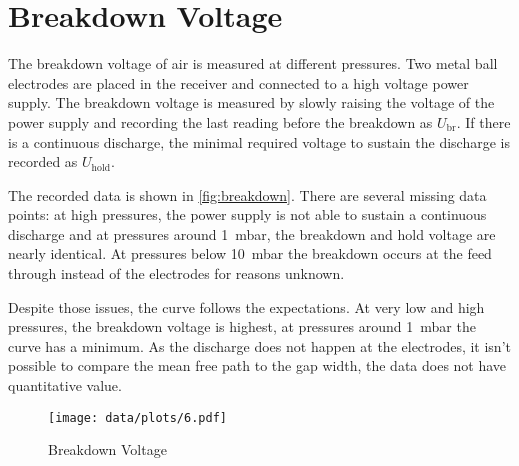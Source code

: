 \chapter{Breakdown Voltage}

The breakdown voltage of air is measured at different pressures.
Two metal ball electrodes are placed in the receiver and connected to a high voltage power supply.
The breakdown voltage is measured by slowly raising the voltage of the power supply and recording the last reading before the breakdown as $U_\text{br}$.
If there is a continuous discharge, the minimal required voltage to sustain the discharge is recorded as $U_\text{hold}$.

The recorded data is shown in \autoref{fig:breakdown}.
There are several missing data points: at high pressures, the power supply is not able to sustain a continuous discharge and at pressures around \SI{1}{\milli\bar}, the breakdown and hold voltage are nearly identical.
At pressures below \SI{10}{\milli\bar} the breakdown occurs at the feed through instead of the electrodes for reasons unknown.

Despite those issues, the curve follows the expectations.
At very low and high pressures, the breakdown voltage is highest, at pressures around \SI{1}{\milli\bar} the curve has a minimum.
As the discharge does not happen at the electrodes, it isn't possible to compare the mean free path to the gap width, the data does not have quantitative value.

\begin{figure}[b!]
	\centering
	\texttt{[image: data/plots/6.pdf]}
	\caption{Breakdown Voltage}
	\label{fig:breakdown}
\end{figure}
